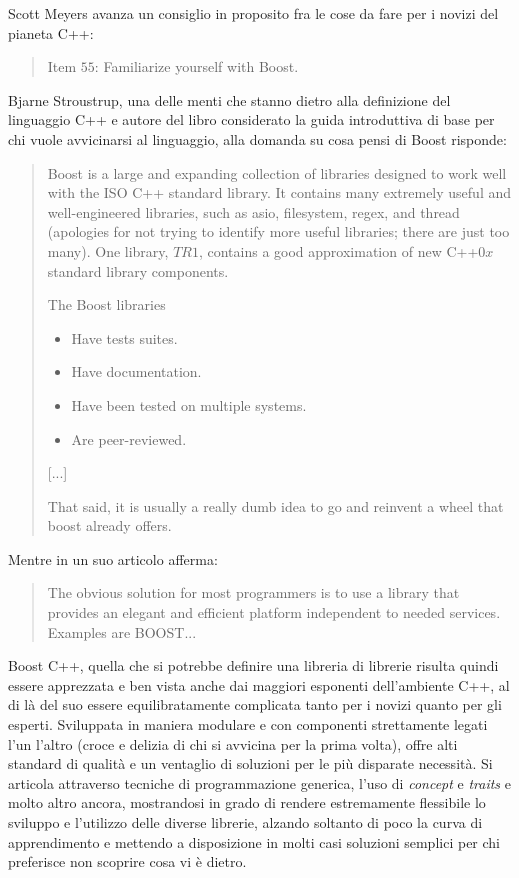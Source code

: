 Scott Meyers avanza un consiglio in proposito \cite{EffectiveCpp} fra le cose da fare per i novizi del pianeta C++:
\begin{quote}
 Item $55$: Familiarize yourself with Boost.
\end{quote}

Bjarne Stroustrup, una delle menti che stanno dietro alla definizione del linguaggio C++ e autore del libro \cite{Stroustrup} considerato la guida introduttiva di base per chi vuole avvicinarsi al linguaggio, alla domanda su cosa pensi di Boost risponde:
\begin{quote}
Boost is a large and expanding collection of libraries designed to work well with the ISO C++ standard library. It contains many extremely useful and well-engineered libraries, such as asio, filesystem, regex, and thread (apologies for not trying to identify more useful libraries; there are just too many). One library, $TR1$, contains a good approximation of new C++$0x$ standard library components.

The Boost libraries
\begin{itemize}
 \item Have tests suites.
 \item Have documentation.
 \item  Have been tested on multiple systems.
 \item Are peer-reviewed.
\end{itemize}

[...]

That said, it is usually a really dumb idea to go and reinvent a wheel that boost already offers.
\end{quote}
Mentre in un suo articolo \cite{StroustrupCpp} afferma:
\begin{quote}
 The obvious solution for most programmers is to use a library that provides an elegant and efficient platform independent to needed services. Examples are BOOST...
\end{quote}

Boost C++, quella che si potrebbe definire una libreria di librerie risulta quindi essere apprezzata e ben vista anche dai maggiori esponenti dell'ambiente C++, al di là del suo essere equilibratamente complicata tanto per i novizi quanto per gli esperti. Sviluppata in maniera modulare e con componenti strettamente legati l'un l'altro (croce e delizia di chi si avvicina per la prima volta), offre alti standard di qualità e un ventaglio di soluzioni per le più disparate necessità. Si articola attraverso tecniche di programmazione generica, l'uso di \textit{concept} e \textit{traits} e molto altro ancora, mostrandosi in grado di rendere estremamente flessibile lo sviluppo e l'utilizzo delle diverse librerie, alzando soltanto di poco la curva di apprendimento e mettendo a disposizione in molti casi soluzioni semplici per chi preferisce non scoprire cosa vi è dietro.

